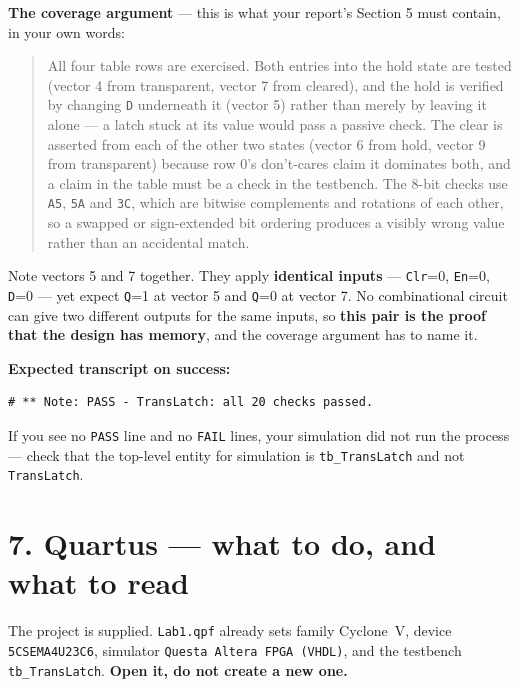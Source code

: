 \documentclass[11pt]{article}
\newcommand{\code}[1]{\texttt{#1}}
\begin{document}
\textbf{The coverage argument} --- this is what your report's Section 5 must contain,
in your own words:

\begin{quote}
All four table rows are exercised. Both entries into the hold state are tested
(vector 4 from transparent, vector 7 from cleared), and the hold is verified by
changing \code{D} underneath it (vector 5) rather than merely by leaving it alone ---
a latch stuck at its value would pass a passive check. The clear is asserted from
each of the other two states (vector 6 from hold, vector 9 from transparent) because
row 0's don't-cares claim it dominates both, and a claim in the table must be a
check in the testbench. The 8-bit checks use \code{A5}, \code{5A} and \code{3C},
which are bitwise complements and rotations of each other, so a swapped or
sign-extended bit ordering produces a visibly wrong value rather than an accidental
match.
\end{quote}

Note vectors 5 and 7 together. They apply \textbf{identical inputs} ---
\code{Clr}=0, \code{En}=0, \code{D}=0 --- yet expect \code{Q}=1 at vector 5 and
\code{Q}=0 at vector 7. No combinational circuit can give two different outputs for
the same inputs, so \textbf{this pair is the proof that the design has memory}, and
the coverage argument has to name it.

\textbf{Expected transcript on success:}
\begin{lstlisting}
# ** Note: PASS - TransLatch: all 20 checks passed.
\end{lstlisting}

If you see no \code{PASS} line and no \code{FAIL} lines, your simulation did not run
the process --- check that the top-level entity for simulation is \code{tb\_TransLatch}
and not \code{TransLatch}.

\section*{7. Quartus --- what to do, and what to read}

The project is supplied. \code{Lab1.qpf} already sets family Cyclone~V, device
\code{5CSEMA4U23C6}, simulator \code{Questa Altera FPGA (VHDL)}, and the testbench
\code{tb\_TransLatch}. \textbf{Open it, do not create a new one.}
\end{document}
